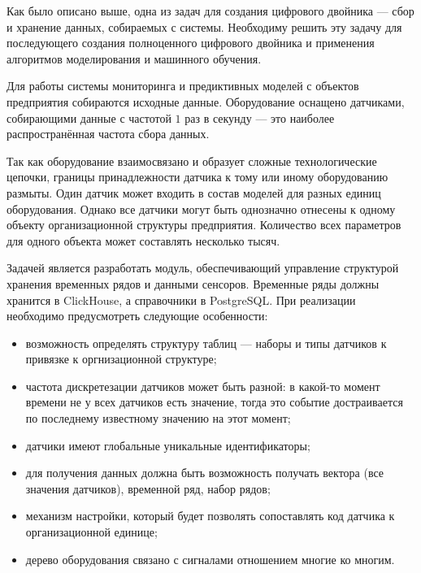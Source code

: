 Как было описано выше, одна из задач для создания цифрового двойника --- сбор и хранение данных, собираемых с системы. Необходиму решить эту задачу для последующего создания полноценного цифрового двойника и применения алгоритмов моделирования и машинного обучения.

Для работы системы мониторинга и предиктивных моделей с объектов предприятия собираются исходные данные. Оборудование оснащено датчиками, собирающими данные с частотой $1$ раз в секунду --- это наиболее распространённая частота сбора данных.

Так как оборудование взаимосвязано и образует сложные технологические цепочки, границы принадлежности датчика к тому или иному оборудованию размыты. Один датчик может входить в состав моделей для разных единиц оборудования. Однако все датчики могут быть однозначно отнесены к одному объекту организационной структуры предприятия. Количество всех параметров для одного объекта может составлять несколько тысяч.

Задачей является разработать модуль, обеспечивающий управление структурой хранения временных рядов и данными сенсоров. Временные ряды должны хранится в ClickHouse, а справочники в PostgreSQL. При реализации необходимо предусмотреть следующие особенности:

\begin{itemize}
    \item возможность определять структуру таблиц --- наборы и типы датчиков к привязке к оргнизационной структуре;
    \item частота дискретезации датчиков может быть разной: в какой-то момент времени не у всех датчиков есть значение, тогда это событие достраивается по последнему известному значению на этот момент;
    \item датчики имеют глобальные уникальные идентификаторы;
    \item для получения данных должна быть возможность получать вектора (все значения датчиков), временной ряд, набор рядов;
    \item механизм настройки, который будет позволять сопоставлять код датчика к организационной единице;
    \item дерево оборудования связано с сигналами отношением многие ко многим.
\end{itemize}